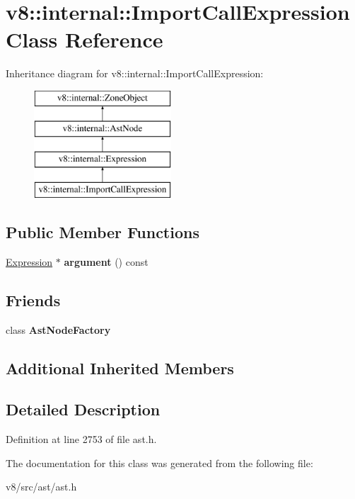 \hypertarget{classv8_1_1internal_1_1ImportCallExpression}{}\section{v8\+:\+:internal\+:\+:Import\+Call\+Expression Class Reference}
\label{classv8_1_1internal_1_1ImportCallExpression}
Inheritance diagram for v8\+:\+:internal\+:\+:Import\+Call\+Expression\+:\begin{figure}[H]
\begin{center}
\leavevmode
\includegraphics[height=4.000000cm]{classv8_1_1internal_1_1ImportCallExpression}
\end{center}
\end{figure}
\subsection*{Public Member Functions}
\begin{DoxyCompactItemize}
\item 
\mbox{\label{classv8_1_1internal_1_1ImportCallExpression_aa0dc06bebf451768b64e1f444987ef19}} 
\mbox{\hyperlink{classv8_1_1internal_1_1Expression}{Expression}} $\ast$ {\bfseries argument} () const
\end{DoxyCompactItemize}
\subsection*{Friends}
\begin{DoxyCompactItemize}
\item 
\mbox{\label{classv8_1_1internal_1_1ImportCallExpression_a8d587c8ad3515ff6433eb83c578e795f}} 
class {\bfseries Ast\+Node\+Factory}
\end{DoxyCompactItemize}
\subsection*{Additional Inherited Members}


\subsection{Detailed Description}


Definition at line 2753 of file ast.\+h.



The documentation for this class was generated from the following file\+:\begin{DoxyCompactItemize}
\item 
v8/src/ast/ast.\+h\end{DoxyCompactItemize}
